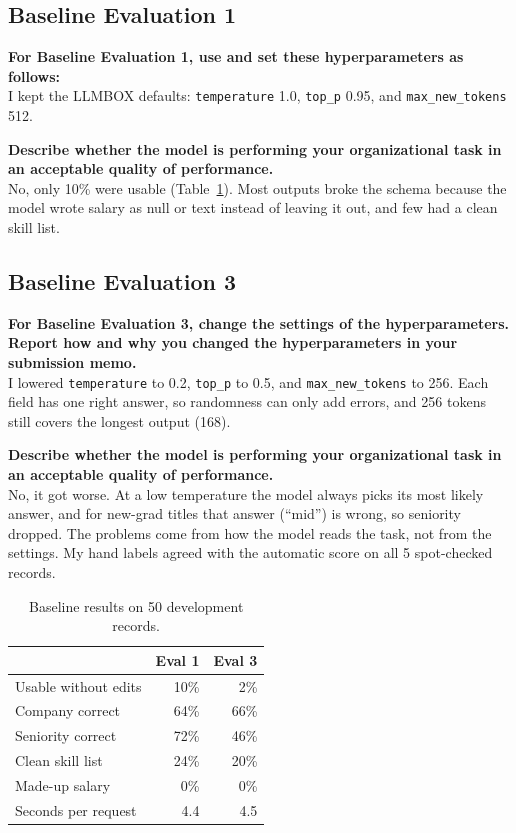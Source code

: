 \documentclass[11pt]{article}
\newcommand{\q}[1]{\par\noindent\textbf{#1}\\}
\begin{document}
\subsection{Baseline Evaluation 1}

\q{For Baseline Evaluation 1, use and set these hyperparameters as follows:}
I kept the LLMBOX defaults: \texttt{temperature} 1.0, \texttt{top\_p} 0.95, and \texttt{max\_new\_tokens} 512.

\q{Describe whether the model is performing your organizational task in an acceptable quality of performance.}
No, only 10\% were usable (Table~\ref{tab:b}). Most outputs broke the schema because the model wrote salary as null or text instead of leaving it out, and few had a clean skill list.

\subsection{Baseline Evaluation 3}

\q{For Baseline Evaluation 3, change the settings of the hyperparameters. Report how and why you changed the hyperparameters in your submission memo.}
I lowered \texttt{temperature} to 0.2, \texttt{top\_p} to 0.5, and \texttt{max\_new\_tokens} to 256. Each field has one right answer, so randomness can only add errors, and 256 tokens still covers the longest output (168).

\q{Describe whether the model is performing your organizational task in an acceptable quality of performance.}
No, it got worse. At a low temperature the model always picks its most likely answer, and for new-grad titles that answer (``mid'') is wrong, so seniority dropped. The problems come from how the model reads the task, not from the settings. My hand labels agreed with the automatic score on all 5 spot-checked records.

\begin{table}[H]
\centering
\small
\begin{tabular}{lrr}
\toprule
& \textbf{Eval 1} & \textbf{Eval 3} \\
\midrule
Usable without edits & 10\% & 2\% \\
Company correct & 64\% & 66\% \\
Seniority correct & 72\% & 46\% \\
Clean skill list & 24\% & 20\% \\
Made-up salary & 0\% & 0\% \\
Seconds per request & 4.4 & 4.5 \\
\bottomrule
\end{tabular}
\caption{Baseline results on 50 development records.}
\label{tab:b}
\end{table}
\end{document}
